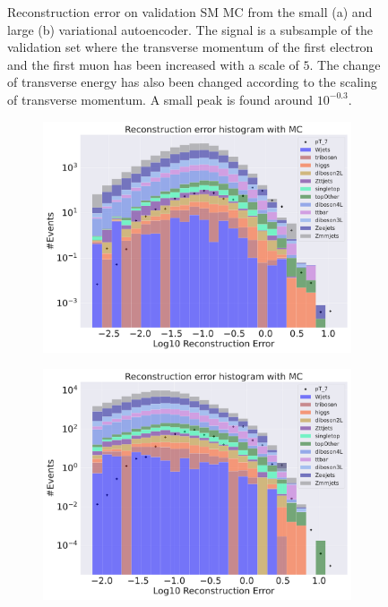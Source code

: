 \begin{figure}[H]
\begin{subfigure}{.45\textwidth}
        \caption{ }
        \label{fig:VAE_big_pt_5}
    \end{subfigure}
    \hfill 
    \caption[VAE | Reconstruction error $p_T$ altering of 5]{Reconstruction error on validation SM MC from the small (a) and large (b) variational autoencoder. The signal is a subsample of the validation 
    set where the transverse momentum of the first electron and the first muon has been increased with a scale of $5$. The change of transverse 
    energy has also been changed according to the scaling of transverse momentum. A small peak is found around $10^{-0.3}$. }
    \label{fig:VAE_big_small_pt_5}
\end{figure}


\begin{figure}[H]
    \centering
    \begin{subfigure}{.45\textwidth}
        \includegraphics[width=\textwidth]{Figures/VAE_testing/small/b_data_recon_big_rm3_feats_sig_pT_7.pdf}
        \caption{}
        \label{fig:VAE_small_pt_7}
    \end{subfigure}
    \hfill 
    \begin{subfigure}{.45\textwidth}
        \includegraphics[width=\textwidth]{Figures/VAE_testing/big/b_data_recon_big_rm3_feats_sig_pT_7.pdf}

\end{subfigure}
\end{figure}
